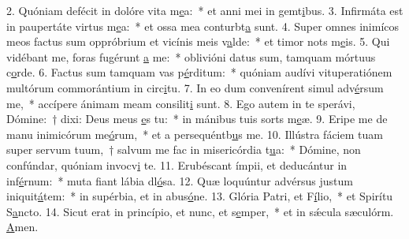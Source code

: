 2. Quóniam defécit in dolóre vita m\uline{e}a:~* et anni mei in gemt\uline{i}bus.
3. Infirmáta est in paupertáte virtus m\uline{e}a:~* et ossa mea conturbt\uline{a} sunt.
4. Super omnes inimícos meos factus sum oppróbrium et vicínis meis v\uline{a}lde:~* et timor nots m\uline{e}is.
5. Qui vidébant me, foras fugérunt \uline{a} me:~* oblivióni datus sum, tamquam mórtuus  c\uline{o}rde.
6. Factus sum tamquam vas p\uline{é}rditum:~* quóniam audívi vituperatiónem multórum commorántium in circ\uline{i}tu.
7. In eo dum convenírent simul adv\uline{é}rsum me,~* accípere ánimam meam consilit\uline{i} sunt.
8. Ego autem in te sperávi, Dómine:~† dixi: Deus meus \uline{e}s tu:~* in mánibus tuis sorts m\uline{e}æ.
9. Eripe me de manu inimicórum me\uline{ó}rum,~* et a persequéntb\uline{u}s me.
10. Illústra fáciem tuam super servum tuum,~† salvum me fac in misericórdia t\uline{u}a:~* Dómine, non confúndar, quóniam invocv\uline{i} te.
11. Erubéscant ímpii, et deducántur in inf\uline{é}rnum:~* muta fiant lábia dl\uline{ó}sa.
12. Quæ loquúntur advérsus justum iniquit\uline{á}tem:~* in supérbia, et in abus\uline{ó}ne.
13. Glória Patri, et F\uline{í}lio,~* et Spirítu S\uline{a}ncto.
14. Sicut erat in princípio, et nunc, et s\uline{e}mper,~* et in sǽcula sæculórm. \uline{A}men.
